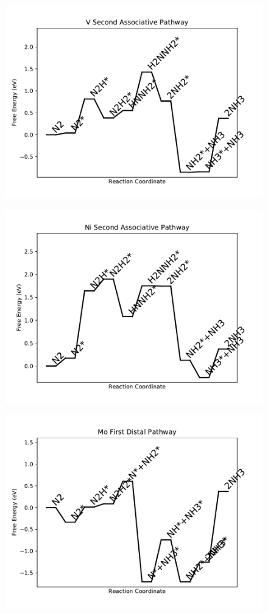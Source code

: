 \begin{figure}
\centering
\includegraphics[width=0.8\linewidth]{data/plots/V_associative_2.pdf}
\end{figure}

\begin{figure}
\centering
\includegraphics[width=0.8\linewidth]{data/plots/Ni_associative_2.pdf}
\end{figure}

\begin{figure}
\centering
\includegraphics[width=0.8\linewidth]{data/plots/Mo_distal_1.pdf}
\end{figure}


